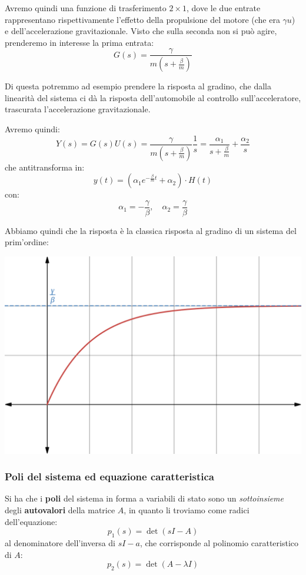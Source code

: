 \documentclass[a4paper,11pt]{article}
\begin{document}
Avremo quindi una funzione di trasferimento $2\times 1$, dove le due entrate rappresentano rispettivamente l'effetto della propulsione del motore (che era $\gamma u$) e dell'accelerazione gravitazionale.
Visto che sulla seconda non si può agire, prenderemo in interesse la prima entrata:
$$
G(s) = \frac{\gamma}{m \left( s + \frac{\beta}{m} \right)}
$$

Di questa potremmo ad esempio prendere la risposta al gradino, che dalla linearità del sistema ci dà la risposta dell'automobile al controllo sull'acceleratore, trascurata l'accelerazione gravitazionale.

Avremo quindi:
$$
Y(s) = G(s) U(s) = \frac{\gamma}{m \left( s + \frac{\beta}{m} \right)} \frac{1}{s} = \frac{\alpha_1}{s + \frac{\beta}{m}} + \frac{\alpha_2}{s}
$$
che antitransforma in:
$$
y(t) = \left( \alpha_1 e^{-\frac{\beta}{m} t} + \alpha_2 \right) \cdot H(t)
$$
con:
$$
\alpha_1 = - \frac{\gamma}{\beta}, \quad \alpha_2 = \frac{\gamma}{\beta}
$$

\noindent
\begin{minipage}{\textwidth}
Abbiamo quindi che la risposta è la classica risposta al gradino di un sistema del prim'ordine:
\begin{center}
	\includegraphics[scale=0.28]{../figures/crociera_first_order.png}
\end{center}
\end{minipage}

\subsubsection{Poli del sistema ed equazione caratteristica}
Si ha che i \textbf{poli} del sistema in forma a variabili di stato sono un \textit{sottoinsieme} degli \textbf{autovalori} della matrice $A$, in quanto li troviamo come radici dell'equazione:
$$
p_1(s) = \det(sI - A)
$$
al denominatore dell'inversa di $sI - a$, che corrisponde al polinomio caratteristico di $A$:
$$
p_2(s) = \det(A - \lambda I)
$$
\end{document}

